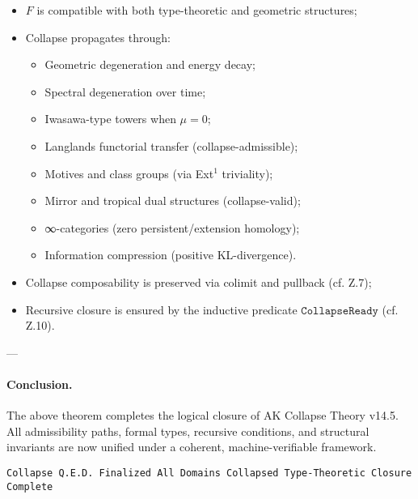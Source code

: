 \documentclass[11pt]{article}
\begin{document}
\begin{itemize}
  \item \( F \) is compatible with both type-theoretic and geometric structures;
  \item Collapse propagates through:
    \begin{itemize}
      \item Geometric degeneration and energy decay;
      \item Spectral degeneration over time;
      \item Iwasawa-type towers when \( \mu = 0 \);
      \item Langlands functorial transfer (collapse-admissible);
      \item Motives and class groups (via Ext$^1$ triviality);
      \item Mirror and tropical dual structures (collapse-valid);
      \item ∞-categories (zero persistent/extension homology);
      \item Information compression (positive KL-divergence).
    \end{itemize}
  \item Collapse composability is preserved via colimit and pullback (cf. Z.7);
  \item Recursive closure is ensured by the inductive predicate \( \texttt{CollapseReady} \) (cf. Z.10).
\end{itemize}

---

\paragraph{Conclusion.}
The above theorem completes the logical closure of AK Collapse Theory v14.5.  
All admissibility paths, formal types, recursive conditions, and structural invariants are now unified under a coherent, machine-verifiable framework.

\vspace{1em}
\begin{flushright}
\texttt{Collapse Q.E.D. Finalized \quad All Domains Collapsed \quad Type-Theoretic Closure Complete}
\end{flushright}
\end{document}
